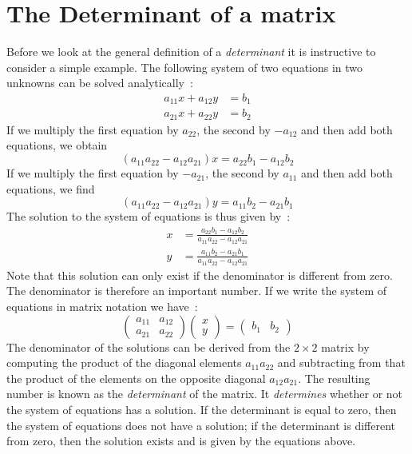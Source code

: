 \section{The Determinant of a matrix}\label{\chabbr:sec:determinant}

Before we look at the general definition of a \textit{determinant} it is instructive to consider a simple example.
The following system of two equations in two unknowns can be solved analytically~:
\begin{align}
a_{11}x+a_{12}y&=b_1\nonumber\\
a_{21}x+a_{22}y&=b_2\nonumber
\end{align}
If we multiply the first equation by $a_{22}$, the second by $-a_{12}$ and then add both equations, we obtain
\[
(a_{11}a_{22}-a_{12}a_{21})x=a_{22}b_1-a_{12}b_2
\]
If we multiply the first equation by $-a_{21}$, the second by $a_{11}$ and then add both equations, we find
\[
(a_{11}a_{22}-a_{12}a_{21})y=a_{11}b_2-a_{21}b_1
\]
The solution to the system of equations is thus given by~:
\begin{align}
x&=\frac{a_{22}b_1-a_{12}b_2}{a_{11}a_{22}-a_{12}a_{21}}\nonumber\\
y&=\frac{a_{11}b_2-a_{21}b_1}{a_{11}a_{22}-a_{12}a_{21}}\nonumber
\end{align}
Note that this solution can only exist if the denominator is different from zero.  The denominator is therefore
an important number.  If we write the system of equations in matrix notation we have~:
\[
\begin{pmatrix}a_{11}&a_{12}\\ a_{21}&a_{22}\end{pmatrix}\begin{pmatrix}x\\ y\end{pmatrix}=\begin{pmatrix}b_1&b_2\end{pmatrix}
\]
The denominator of the solutions can be derived from the $2\times 2$ matrix by computing the product of the diagonal
elements $a_{11}a_{22}$ and subtracting from that the product of the elements on the opposite diagonal $a_{12}a_{21}$.
The resulting number is known as the \textit{determinant} of the matrix.  It \textit{determines} whether or not the system
of equations has a solution.  If the determinant is equal to zero, then the system of equations does not have a solution;  if
the determinant is different from zero, then the solution exists and is given by the equations above.


